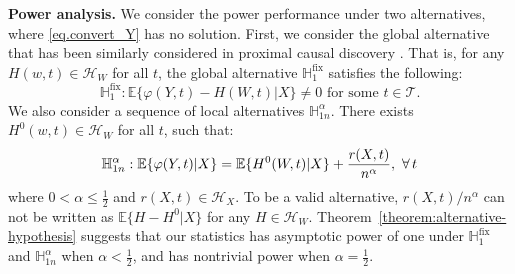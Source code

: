 \documentclass[
  12pt]{article}
\newtheorem{assumption}{Condition}
\def\wh{\widehat}
\def\mE{\mathbb{E}}
\def\mH{\mathbb{H}}
\def\cH{\mathcal{H}}
\def\cT{\mathcal{T}}
\def\mE{\mathbb{E}}
\begin{document}
\textbf{Power analysis.} We consider the power performance under two alternatives, where \eqref{eq.convert_Y} has no solution. First, we consider the global alternative that has been similarly considered in proximal causal discovery \citep{liu2023causal}. That is, for any $H(w,t) \in \cH_W$ for all $t$, the global alternative $\mH_1^{\mathrm{fix}}$ satisfies the following:
\begin{equation*}
    \mH_1^{\mathrm{fix}}: \mathbb{E}\{\varphi(Y,t)-H(W,t)|X\} \neq 0 \text{ for some $t \in \cT$}. 
\end{equation*}
We also consider a sequence of local alternatives $\mH^\alpha_{1n}$. There exists $H^0(w,t) \in \cH_W$ for all $t$, such that: 
\begin{equation*}
    \mathbb H^\alpha_{1n}: \mathbb{E}\{\varphi(Y,t)|X\}= \mathbb{E}\{H^0(W,t)|X\}+\frac{r(X,t)}{n^\alpha}, \ \forall \thinspace t
\end{equation*}
where $0 < \alpha \leq \frac{1}{2}$ and $r(X,t)\in\cH_X$. To be a valid alternative, $r(X,t)/n^\alpha$ can not be written as $\mE\{H - H^0|X\}$ for any $H \in \cH_W$. Theorem~\ref{theorem:alternative-hypothesis} suggests that our statistics has asymptotic power of one under $\mH_1^{\mathrm{fix}}$ and $\mH^\alpha_{1n}$ when $\alpha < \frac{1}{2}$, and has nontrivial power when $\alpha = \frac{1}{2}$. 
\end{document}
